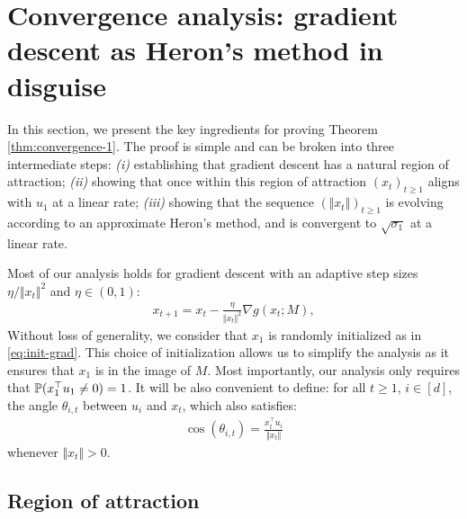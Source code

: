 \section{Convergence analysis: gradient descent as Heron's method in disguise}\label{sec:proof}

In this section, we present the key ingredients for proving Theorem \ref{thm:convergence-1}. The proof is simple and can be broken into three intermediate steps: \emph{(i)}  establishing that gradient descent has a natural region of attraction; \emph{(ii)} showing that once within this region of attraction $(x_t)_{t \ge 1}$ aligns with $u_1$ at a linear rate; \emph{(iii)}  showing that the sequence $(\Vert x_t \Vert)_{t \ge 1}$ is evolving according to an approximate Heron's method, and is convergent to $\sqrt{\sigma_1}$ at a linear rate.


Most of our analysis holds for gradient descent with an adaptive step sizes $\eta / \Vert x_t \Vert^2$ and $\eta \in (0,1)$:  
\begin{align}\label{eq:gradient eta}
    x_{t+1} = x_t -  \frac{\eta}{\Vert x_t \Vert^2} \nabla g(x_t; M),
\end{align}
Without loss of generality, we consider that $x_1$ is randomly initialized as in \eqref{eq:init-grad}. This choice of initialization allows us to simplify the analysis as it ensures that $x_1$ is in the image of $M$. Most importantly, our analysis only requires that $\mathbb{P}( x_1^\top u_1 \neq 0) = 1$. It will be also convenient to define: for all $t \ge 1$, $i \in [d]$, the angle $\theta_{i,t}$ between $u_i$ and $x_t$, which also satisfies:  
\begin{align}
    \cos(\theta_{i,t}) = \frac{x_t ^\top u_i}{\Vert x_t \Vert}
\end{align}
whenever $\Vert x_t \Vert > 0$. 

\subsection{Region of attraction}

